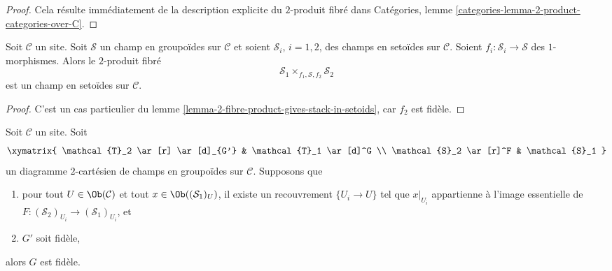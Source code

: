 \begin{proof}
Cela résulte immédiatement de la description explicite du $2$-produit fibré dans
Catégories, lemme \ref{categories-lemma-2-product-categories-over-C}.
\end{proof}

\begin{lemma}
\label{lemma-2-fibre-product-stacks-in-setoids-over-stack-in-groupoids}
Soit $\mathcal{C}$ un site.
Soit $\mathcal{S}$ un champ en groupoïdes sur $\mathcal{C}$ et
soient $\mathcal{S}_i$, $i = 1, 2$, des champs en setoïdes sur $\mathcal{C}$.
Soient $f_i : \mathcal{S}_i \to \mathcal{S}$ des $1$-morphismes.
Alors le $2$-produit fibré
$$
\mathcal{S}_1 \times_{f_1, \mathcal{S}, f_2} \mathcal{S}_2
$$
est un champ en setoïdes sur $\mathcal{C}$.
\end{lemma}

\begin{proof}
C'est un cas particulier du
lemme \ref{lemma-2-fibre-product-gives-stack-in-setoids},
car $f_2$ est fidèle.
\end{proof}

\begin{lemma}
\label{lemma-faithful-descent}
Soit $\mathcal{C}$ un site. Soit
$$
\xymatrix{
\mathcal{T}_2 \ar[r] \ar[d]_{G'} & \mathcal{T}_1 \ar[d]^G \\
\mathcal{S}_2 \ar[r]^F & \mathcal{S}_1
}
$$
un diagramme $2$-cartésien de champs en groupoïdes sur $\mathcal{C}$.
Supposons que
\begin{enumerate}
\item pour tout $U \in \Ob(\mathcal{C})$ et tout
$x \in \Ob((\mathcal{S}_1)_U)$, il existe un recouvrement
$\{U_i \to U\}$ tel que $x|_{U_i}$ appartienne à l'image
essentielle de $F : (\mathcal{S}_2)_{U_i} \to (\mathcal{S}_1)_{U_i}$, et
\item $G'$ soit fidèle,
\end{enumerate}
alors $G$ est fidèle.
\end{lemma}

